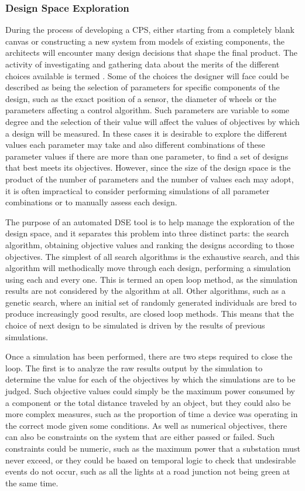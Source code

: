 \subsubsection{Design Space Exploration}
\label{sec:concepts:dse}
During the process of developing a CPS, either starting from a completely blank canvas or constructing a new system from models of existing components, the architects will encounter many design decisions that shape the final product.
The activity of investigating and gathering data about the merits of the different choices available is termed .
Some of the choices the designer will face could be described as being the selection of parameters for specific components of the design, such as the exact position of a sensor, the diameter of wheels or the parameters affecting a control algorithm.
Such parameters are variable to some degree and the selection of their value will affect the values of objectives by which a design will be measured.
In these cases it is desirable to explore the different values each parameter may take and also different combinations of these parameter values if there are more than one parameter, to find a set of designs that best meets its objectives.
However, since the size of the design space is the product of the number of parameters and the number of values each may adopt, it is often impractical to consider performing simulations of all parameter combinations or to manually assess each design.

The purpose of an automated DSE tool is to help manage the exploration of the design space, and it separates this problem into three distinct parts:  the search algorithm, obtaining objective values and ranking the designs according to those objectives.
The simplest of all search algorithms is the exhaustive search, and this algorithm will methodically move through each design, performing a simulation using each and every one.
This is termed an open loop method, as the simulation results are not considered by the algorithm at all.
Other algorithms, such as a genetic search, where an initial set of randomly generated individuals are bred to produce increasingly good results, are closed loop methods.
This means that the choice of next design to be simulated is driven by the results of previous simulations.

Once a simulation has been performed, there are two steps required to close the loop.
The first is to analyze the raw results output by the simulation to determine the value for each of the objectives by which the simulations are to be judged.
Such objective values could simply be the maximum power consumed by a component or the total distance traveled by an object, but they could also be more complex measures, such as the proportion of time a device was operating in the correct mode given some conditions.
As well as numerical objectives, there can also be constraints on the system that are either passed or failed.
Such constraints could be numeric, such as the maximum power that a substation must never exceed, or they could be based on temporal logic to check that undesirable events do not occur, such as all the lights at a road junction not being green at the same time.

